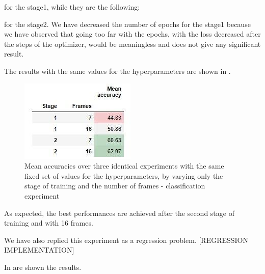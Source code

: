 \documentclass[10pt,twocolumn,hidelinks,letterpaper]{article}
\begin{document}
for the stage1, while they are the following:

\begin{center}
\end{center}

for the stage2. We have decreased the number of epochs for the stage1 because we have observed that going too far with the epochs, with the loss decreased after the steps of the optimizer, would be meaningless and does not give any significant result.

The results with the same values for the hyperparameters are shown in .

\begin{figure}[t]
	\centering
	\includegraphics[width=.6\linewidth]{images/step2.1_table.jpg}
	\caption{Mean accuracies over three identical experiments with the same fixed set of values for the hyperparameters, by varying only the stage of training and the number of frames - classification experiment}
	\label{ms_table}
\end{figure}

As expected, the best performances are achieved after the second stage of training and with 16 frames.

We have also replied this experiment as a regression problem.
[REGRESSION IMPLEMENTATION]

In  are shown the results.
\end{document}
